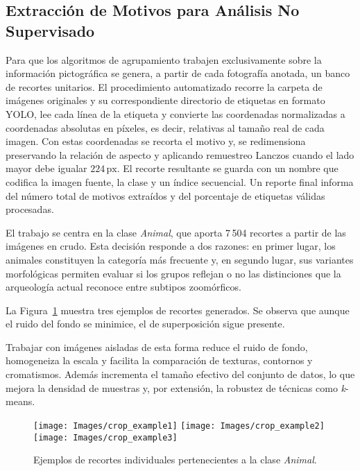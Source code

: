 \subsection{Extracción de Motivos para Análisis No Supervisado}

Para que los algoritmos de agrupamiento trabajen exclusivamente sobre la información pictográfica se genera, a partir de cada fotografía anotada, un banco de recortes unitarios.
El procedimiento automatizado recorre la carpeta de imágenes originales y su correspondiente directorio de etiquetas en formato YOLO, lee cada línea de la etiqueta y convierte las coordenadas normalizadas a coordenadas absolutas en píxeles, es decir, relativas al tamaño real de cada imagen.
Con estas coordenadas se recorta el motivo y, se redimensiona preservando la relación de aspecto y aplicando remuestreo Lanczos cuando el lado mayor debe igualar \(224\,\text{px}\).
El recorte resultante se guarda con un nombre que codifica la imagen fuente, la clase y un índice secuencial.
Un reporte final informa del número total de motivos extraídos y del porcentaje de etiquetas válidas procesadas.

El trabajo se centra en la clase \textit{Animal}, que aporta 7\,504 recortes a partir de las imágenes en crudo.
Esta decisión responde a dos razones: en primer lugar, los animales constituyen la categoría más frecuente y, en segundo lugar, sus variantes morfológicas permiten evaluar si los grupos reflejan o no las distinciones que la arqueología actual reconoce entre subtipos zoomórficos.

La Figura~\ref{fig:crop_example} muestra tres ejemplos de recortes generados.
Se observa que aunque el ruido del fondo se minimice, el de superposición sigue presente.

Trabajar con imágenes aisladas de esta forma reduce el ruido de fondo, homogeneiza la escala y facilita la comparación de texturas, contornos y cromatismos.
Además incrementa el tamaño efectivo del conjunto de datos, lo que mejora la densidad de muestras y, por extensión, la robustez de técnicas como \emph{k}-means.

\begin{figure}[htpb]
    \centering
    \texttt{[image: Images/crop\_example1]}\hfill
    \texttt{[image: Images/crop\_example2]}\hfill
    \texttt{[image: Images/crop\_example3]}
    \caption{Ejemplos de recortes individuales pertenecientes a la clase \textit{Animal}.}
    \label{fig:crop_example}
\end{figure}

